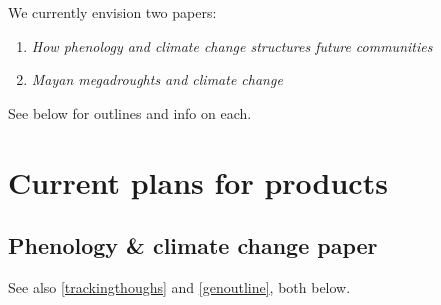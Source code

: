 \documentclass[11pt,a4paper,oneside]{article}
\begin{document}
 We currently envision two papers: 
\begin{enumerate}
\item \emph{How phenology and climate change structures future communities}
\item \emph{Mayan megadroughts and climate change} 
\end{enumerate}
See below for outlines and info on each.
\newpage


\section{Current plans for products}
\subsection{Phenology \& climate change paper}\label{phenCCpaper}

See also \ref{trackingthoughs} and \ref{genoutline}, both below.\\
\end{document}
